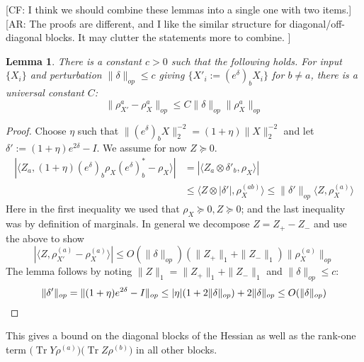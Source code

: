 \documentclass{article}
\newtheorem{lemma}[theorem]{Lemma}
\newcommand\tr{\operatorname{Tr}}
\newcommand{\CF}[1]{{\color{purple}[CF: #1]}}
\newcommand{\AR}[1]{{\color{orange}[AR: #1]}}
\begin{document}
\CF{ I think we should combine these lemmas into a single one with two items.}
\AR{The proofs are different, and I like the similar structure for diagonal/off-diagonal blocks. It may clutter the statements more to combine. }
\begin{lemma} \label{btoaaRobustness}
There is a constant $c>0$ such that the following holds. For input $\{X_{i}\}$ and perturbation $\|\delta\|_{op} \leq c$ giving $\{X'_{i} := (e^{\delta})_{b} X_{i} \}$ for $b \neq a$, there is a universal constant $C$:
\[ \|\rho_{X'}^{a} - \rho_{X}^{a}\|_{op} \leq C \|\delta\|_{op} \|\rho_{X}^{a}\|_{op}      \]
\end{lemma}
\begin{proof} 
Choose $\eta$ such that $\|(e^{\delta})_{b} X\|_{2}^{-2} = (1+\eta) \|X\|_{2}^{-2}$ and let $\delta' := (1+\eta)e^{2\delta} - I$. We assume for now $Z \succeq 0$. 
\begin{align*} | \langle Z_{a}, (1+\eta) (e^{\delta})_{b} \rho_{X} (e^{\delta})_{b}^{*} - \rho_{X} \rangle| 
& = | \langle Z_{a} \otimes \delta'_{b}, \rho_{X} \rangle   |  \\ 
&\leq \langle Z \otimes |\delta'|, \rho_{X}^{(ab)} \rangle   
\leq \|\delta'\|_{op} \langle Z, \rho_{X}^{(a)} \rangle    
\end{align*}
Here in the first inequality we used that $\rho_{X} \succeq 0, Z \succeq 0$; and the last inequality was by definition of marginals. 
In general we decompose $Z = Z_{+} - Z_{-}$ and use the above to show
\[ |\langle Z, \rho_{X'}^{(a)} - \rho_{X}^{(a)} \rangle| \leq O(\|\delta\|_{op}) (\|Z_{+}\|_{1} + \|Z_{-}\|_{1}) \|\rho_{X}^{(a)}\|_{op}     \]
The lemma follows by noting $\|Z\|_{1} = \|Z_{+}\|_{1} + \|Z_{-}\|_{1}$ and $\|\delta\|_{op} \leq c$:
\[ \|\delta'\|_{op} = \|(1+\eta) e^{2 \delta} - I\|_{op} \leq |\eta|(1 + 2 \|\delta\|_{op}) + 2\|\delta\|_{op} \leq O(\|\delta\|_{op})   \qedhere  \]
\end{proof}

This gives a bound on the diagonal blocks of the Hessian as well as the rank-one term $\bigl(\tr Y \rho^{(a)}\bigr)\bigl(\tr Z \rho^{(b)}\bigr)$ in all other blocks.
\end{document}
